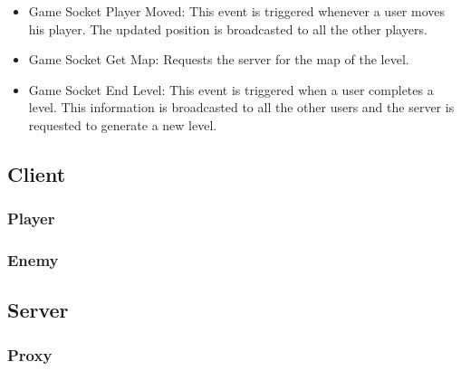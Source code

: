 \documentclass[oneside,12pt]{Classes/VTU}
\begin{document}
\begin{enumerate}[i.]
\begin{itemize}
						\item Game Socket Player Moved: This event is triggered whenever a user moves his player. The updated position is broadcasted to all the other players. 
						
						\item Game Socket Get Map: Requests the server for the map of the level. 
						
						\item Game Socket End Level: This event is triggered when a user completes a level. This information is broadcasted to all the other users and the server is requested to generate a new level. 
					\end{itemize}
				\end{enumerate}
				
			\subsection{Client}
				\subsubsection{Player}
					\paragraph{}
					
				\subsubsection{Enemy}
					\paragraph{}					
				
			\subsection{Server}
				\subsubsection{Proxy}
\end{document}
